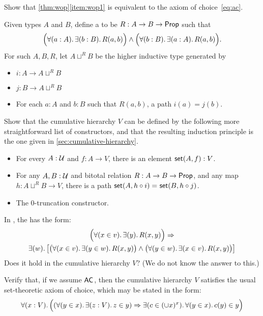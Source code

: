 \documentclass[hott-all.tex]{subfiles}
\begin{document}
% 
\begin{ex}
  Show that \cref{thm:wop}\ref{item:wop1} is equivalent to the axiom of choice~\eqref{eq:ac}.
\end{ex}
% 
\begin{ex}
  Given types $A$ and $B$, define a 
  to be $R:A\to B\to \mathsf{Prop}$ such that
  \[ \Big(\fall{a:A}\exis{b:B} R(a,b) \Big) \land \Big(\fall{b:B}\exis{a:A} R(a,b) \Big). \]
  For such $A,B,R$, let $A\sqcup^R B$ be the higher inductive type generated by
  \begin{itemize}
  \item $i:A\to A\sqcup^R B$
  \item $j:B\to A\sqcup^R B$
  \item For each $a:A$ and $b:B$ such that $R(a,b)$, a path $i(a)=j(b)$.
  \end{itemize}
  Show that the cumulative hierarchy $V$ can be defined by the following more straightforward list of constructors, and that the resulting induction principle is the one given in \cref{sec:cumulative-hierarchy}.
  \begin{itemize}
  \item For every $A : \mathcal{U}$ and $f : A \to V$, there is an element $\mathsf{set}(A, f) : V$.
  \item For any $A,B:\mathcal{U}$ and bitotal relation
    $R:A\to B\to \mathsf{Prop}$, and any map $h:A\sqcup^R B \to V$, there is a path $\mathsf{set}(A,h\circ i) =_{} \mathsf{set}(B,h\circ j)$.
  \item The 0-truncation constructor.
  \end{itemize}
\end{ex}
% 
\begin{ex}
  In \CZF, the 
  has the form:
   \begin{multline*}
   \Parens{\fall{x\in v}\exis{y} R(x,y)} \Rightarrow \\
   \exis{w}\big[\big(\fall{x\in v}\exis{y\in w}R(x,y)\big)\land \big(\fall{y\in w}\exis{x\in v}R(x,y) \big)\big]
   \end{multline*}
   Does it hold in the cumulative hierarchy $V$?  (We do not know the answer to this.)
\end{ex}
% 
\begin{ex}
Verify that, if we assume $\mathsf{AC}_{}$, then the cumulative hierarchy $V$ satisfies the usual set-theoretic axiom of choice, which may be stated in the form:
  \[
   \fall{x:V} \Parens{(\fall{y\in x}\exis{z:V} z\in y) \Rightarrow  \exis{c\in(\cup x)^x}\fall{y\in x} c(y)\in y}
   \]
\end{ex}
\end{document}
